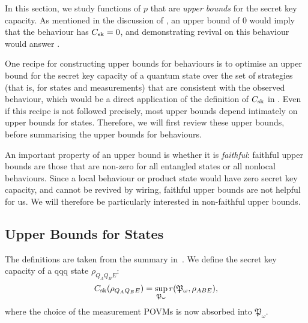 \documentclass[10pt, a4paper]{article}
\numberwithin{equation}{section} %
\theoremstyle{definition}
\theoremstyle{plain}
\newcommand{\?}{\mathrel{?}} %
\newcommand{\sk}{\rm sk}
\begin{document}
      In this section, we study functions of \(p\) that are \emph{upper bounds} for the secret key capacity. As mentioned in the discussion of , an upper bound of 0 would imply that the behaviour has \(C_{\sk} = 0\), and demonstrating revival on this behaviour would answer .

      One recipe for constructing upper bounds for behaviours is to optimise an upper bound for the secret key capacity of a quantum state over the set of strategies (that is, for states and measurements) that are consistent with the observed behaviour, which would be a direct application of the definition of \(C_{\sk}\) in . Even if this recipe is not followed precisely, most upper bounds depend intimately on upper bounds for states. Therefore, we will first review these upper bounds, before summarising the upper bounds for behaviours.

      An important property of an upper bound is whether it is \emph{faithful}: faithful upper bounds are those that are non-zero for all entangled states or all nonlocal behaviours. Since a local behaviour or product state would have zero secret key capacity, and cannot be revived by wiring, faithful upper bounds are not helpful for us. We will therefore be particularly interested in non-faithful upper bounds.

      \subsection{Upper Bounds for States}

      The definitions are taken from the summary in~\cite{CQKeyDistill}. We define the secret key capacity of a qqq state \(\rho_{Q_AQ_BE}\):
      \begin{equation}
      C_{\sk}(\rho_{Q_A Q_B E}) = \sup_{\mathfrak{P}_{\omega}} 
      r(\mathfrak{P}_{\omega}, \rho_{ABE}),
      \end{equation}
      where the choice of the measurement POVMs is now absorbed into \(\mathfrak{P}_{\omega}\).
\end{document}
